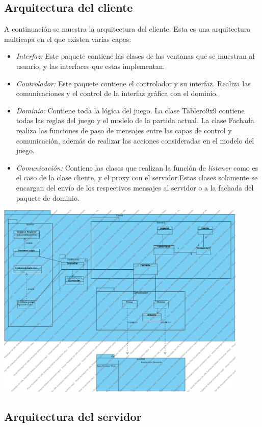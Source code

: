 \documentclass[a4paper,11pt,oneside]{article}
\begin{document}
\subsection{Arquitectura del cliente}

A continuación se muestra la arquitectura del cliente. Esta es una arquitectura multicapa en el que existen varias capas:
\begin{itemize}
\item \emph{Interfaz:} Este paquete contiene las clases de las ventanas que se muestran al usuario, y las interfaces que estas implementan.
\item \emph{Controlador:} Este paquete contiene el controlador y su interfaz. Realiza las comunicaciones y el control de la interfaz gráfica con el dominio.
\item \emph{Dominio:} Contiene toda la lógica del juego. La clase Tablero9x9 contiene todas las reglas del juego y el modelo de la partida actual. La clase Fachada realiza las funciones de paso de mensajes entre las capas de control y comunicación, además de realizar las acciones consideradas en el modelo del juego.
\item \emph{Comunicación:} Contiene las clases que realizan la función de \emph{listener} como es el caso de la clase cliente, y el proxy con el servidor.Estas clases solamente se encargan del envío de los respectivos mensajes al servidor o a la fachada del paquete de dominio.
\end{itemize}
\includegraphics[width=0.9\textwidth]{img/arq_Cliente.png}\\[1cm]

\subsection{Arquitectura del servidor}
\end{document}
